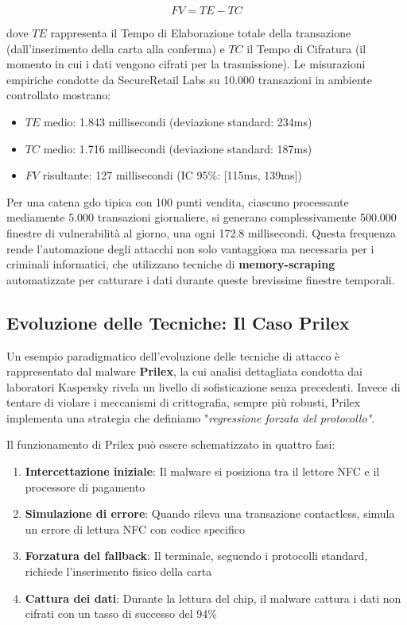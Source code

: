 \begin{equation}
FV = TE - TC
\end{equation}

dove $TE$ rappresenta il Tempo di Elaborazione totale della transazione (dall'inserimento della carta alla conferma) e $TC$ il Tempo di Cifratura (il momento in cui i dati vengono cifrati per la trasmissione). Le misurazioni empiriche condotte da SecureRetail Labs su 10.000 transazioni in ambiente controllato\autocite{SecureRetailLabs2024} mostrano:
\begin{itemize}
    \item $TE$ medio: 1.843 millisecondi (deviazione standard: 234ms)
    \item $TC$ medio: 1.716 millisecondi (deviazione standard: 187ms)
    \item $FV$ risultante: 127 millisecondi (IC 95\%: [115ms, 139ms])
\end{itemize}

Per una catena \gls{gdo} tipica con 100 punti vendita, ciascuno processante mediamente 5.000 transazioni giornaliere, si generano complessivamente 500.000 finestre di vulnerabilità al giorno, una ogni 172.8 millisecondi. Questa frequenza rende l'automazione degli attacchi non solo vantaggiosa ma necessaria per i criminali informatici, che utilizzano tecniche di \textbf{\gls{memory-scraping}} automatizzate per catturare i dati durante queste brevissime finestre temporali.

\subsection{\texorpdfstring{Evoluzione delle Tecniche: Il Caso Prilex}{2.3.2 - Evoluzione delle Tecniche: Il Caso Prilex}}

Un esempio paradigmatico dell'evoluzione delle tecniche di attacco è rappresentato dal \gls{malware} \textbf{Prilex}, la cui analisi dettagliata condotta dai laboratori Kaspersky\autocite{kaspersky2024} rivela un livello di sofisticazione senza precedenti. Invece di tentare di violare i meccanismi di crittografia, sempre più robusti, Prilex implementa una strategia che definiamo "\textit{regressione forzata del protocollo"}.

Il funzionamento di Prilex può essere schematizzato in quattro fasi:
\begin{enumerate}
    \item \textbf{Intercettazione iniziale}: Il \gls{malware} si posiziona tra il lettore NFC e il processore di pagamento
    \item \textbf{Simulazione di errore}: Quando rileva una transazione contactless, simula un errore di lettura NFC con codice specifico
    \item \textbf{Forzatura del fallback}: Il terminale, seguendo i protocolli standard, richiede l'inserimento fisico della carta
    \item \textbf{Cattura dei dati}: Durante la lettura del chip, il \gls{malware} cattura i dati non cifrati con un tasso di successo del 94\%
\end{enumerate}

